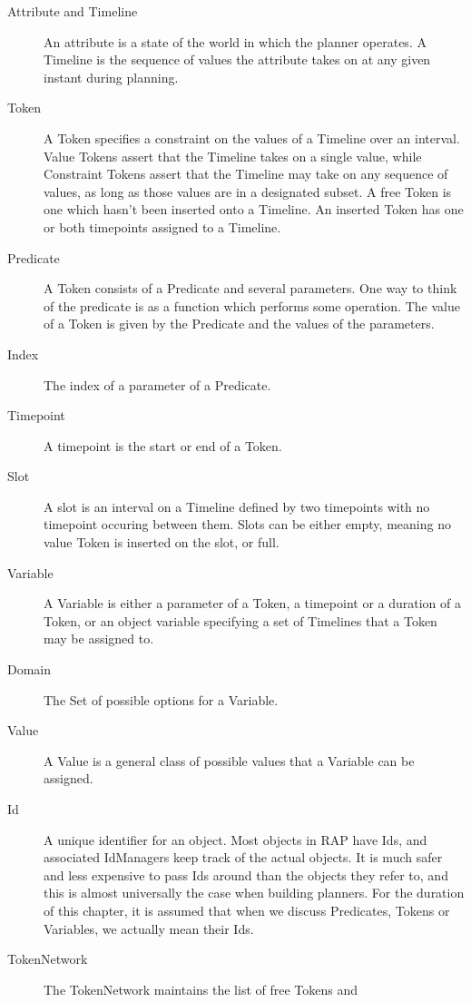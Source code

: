 \begin{description}
    \item[Attribute and Timeline]  An attribute is a state of the world in which
    the planner operates.  A Timeline is the sequence of values the attribute takes
    on at any given instant during planning.
    \item[Token] A Token specifies a constraint on the values of a Timeline over
    an interval.  Value Tokens assert that the Timeline takes on a single value,
    while Constraint Tokens assert that the Timeline may take on any sequence
    of values, as long as those values are in a designated subset.  
    A free Token is one which hasn't been
    inserted onto a Timeline.  An inserted Token has one or both timepoints
    assigned to a Timeline.
    \item[Predicate] A Token consists of a Predicate and several parameters.
    One way to think of the predicate is as a function which performs some
    operation.  The value of a Token is given by the Predicate and the values
    of the parameters.
    \item[Index] The index of a parameter of a Predicate.
    \item[Timepoint] A timepoint is the start or end of a Token.
    \item[Slot] A slot is an interval on a Timeline defined by two timepoints
    with no timepoint occuring between them.
    Slots can be either empty, meaning no value Token is inserted on the slot,
    or full.
    \item[Variable] A Variable is either a parameter of a Token, a timepoint
    or a duration of a Token, or an object variable specifying a set of Timelines that
    a Token may be assigned to.
    \item[Domain] The Set of possible options for a Variable.
    \item[Value] A Value is a general class of possible values that a Variable
    can be assigned.
    \item[Id] A unique identifier for an object.  Most objects in RAP have Ids,
    and associated IdManagers keep track of the actual objects.  It is much safer and less
    expensive to pass Ids around than the objects they refer to, and this is almost
    universally the case when building planners.  For the duration of this
    chapter, it is assumed that when we discuss Predicates,
    Tokens or Variables, we actually mean their Ids.
    \item[TokenNetwork] The TokenNetwork maintains the list of free Tokens and 

\end{description}
